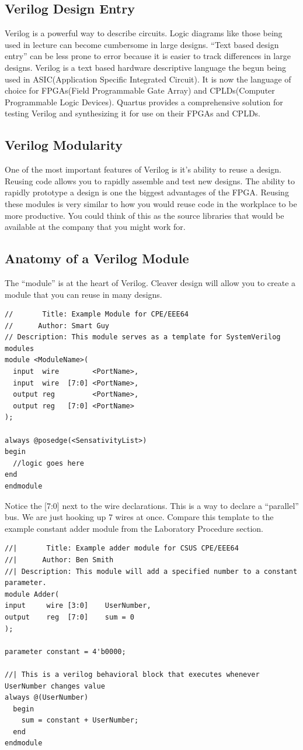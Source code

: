   \subsection{Verilog Design Entry}
    Verilog is a powerful way to describe circuits. Logic diagrams like those being used in lecture can become cumbersome in large designs. ``Text based design entry'' can be less prone to error because it is easier to track differences in large designs. Verilog is a text based hardware descriptive language the begun being used in ASIC(Application Specific Integrated Circuit). It is now the language of choice for FPGAs(Field Programmable Gate Array) and CPLDs(Computer Programmable Logic Devices). Quartus provides a comprehensive solution for testing Verilog and synthesizing it for use on their FPGAs and CPLDs.

  \subsection{Verilog Modularity}
    One of the most important features of Verilog is it's ability to reuse a design. Reusing code allows you to  rapidly assemble and test new designs. The ability to rapidly prototype a design is one the biggest advantages of the FPGA. Reusing these modules is very similar to how you would reuse code in the workplace to be more productive. You could think of this as the source libraries that would be available at the company that you might work for.

  \subsection{Anatomy of a Verilog Module}
    The ``module'' is at the heart of Verilog. Cleaver design will allow you to create a module that you can reuse in many designs.
    \begin{lstlisting}[caption={Example Module}]
//       Title: Example Module for CPE/EEE64
//      Author: Smart Guy
// Description: This module serves as a template for SystemVerilog modules
module <ModuleName>(
  input  wire        <PortName>,
  input  wire  [7:0] <PortName>,
  output reg         <PortName>,
  output reg   [7:0] <PortName>
);

always @posedge(<SensativityList>)
begin
  //logic goes here
end
endmodule
    \end{lstlisting}
    Notice the [7:0] next to the wire declarations. This is a way to declare a ``parallel'' bus. We are just hooking up 7 wires at once. Compare this template to the example constant adder module from the Laboratory Procedure section.
\begin{lstlisting}
//|       Title: Example adder module for CSUS CPE/EEE64
//|      Author: Ben Smith
//| Description: This module will add a specified number to a constant parameter.
module Adder(
input     wire [3:0]    UserNumber,
output    reg  [7:0]    sum = 0
);

parameter constant = 4'b0000;

//| This is a verilog behavioral block that executes whenever UserNumber changes value
always @(UserNumber)
  begin
    sum = constant + UserNumber;
  end
endmodule
\end{lstlisting}

